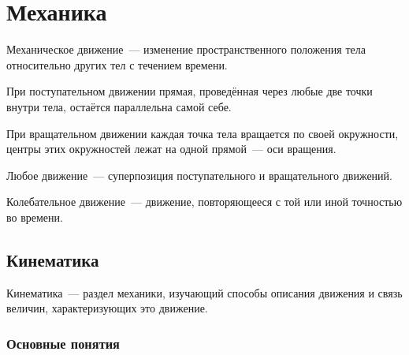 \documentclass[12pt]{article}
\begin{document}
\tableofcontents
\setcounter{tocdepth}{3}
\newpage

\section{Механика}

\begin{definition}
	Механическое движение~--- изменение пространственного положения тела относительно других тел с течением времени.
\end{definition}
\begin{definition}
	При поступательном движении прямая, проведённая через любые две точки внутри тела, остаётся параллельна самой себе.
\end{definition}
\begin{definition}
	При вращательном движении каждая точка тела вращается по своей окружности, центры этих окружностей лежат на одной прямой~--- оси вращения.
\end{definition}
\begin{statement}
	Любое движение~--- суперпозиция поступательного и вращательного движений.
\end{statement}
\begin{definition}
	Колебательное движение~--- движение, повторяющееся с той или иной точностью во времени.
\end{definition}

\subsection{Кинематика}

\begin{definition}
	Кинематика~--- раздел механики, изучающий способы описания движения и связь величин, характеризующих это движение.
\end{definition}

\subsubsection{Основные понятия}
\end{document}
